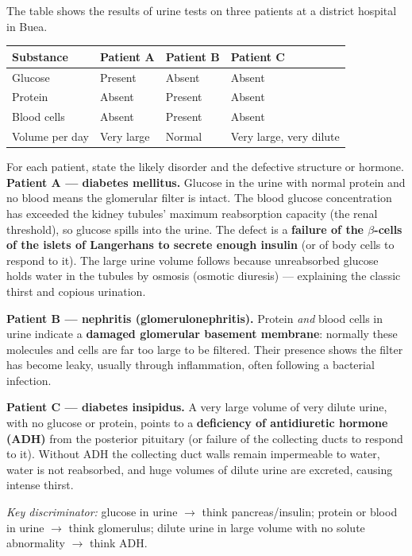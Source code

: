 \documentclass[11pt]{article}
\begin{document}
\begin{exoresolu}
The table shows the results of urine tests on three patients at a district hospital in Buea.

\begin{center}
\begin{tabularx}{\linewidth}{|l|X|X|X|}\hline
\rowcolor{popblueL} \textbf{Substance} & \textbf{Patient A} & \textbf{Patient B} & \textbf{Patient C} \\ \hline
Glucose & Present & Absent & Absent \\ \hline
Protein & Absent & Present & Absent \\ \hline
Blood cells & Absent & Present & Absent \\ \hline
Volume per day & Very large & Normal & Very large, very dilute \\ \hline
\end{tabularx}
\end{center}

For each patient, state the likely disorder and the defective structure or hormone.
\tcblower
\textbf{Patient A — diabetes mellitus.} Glucose in the urine with normal protein and no blood means the glomerular filter is intact. The blood glucose concentration has exceeded the kidney tubules' maximum reabsorption capacity (the renal threshold), so glucose spills into the urine. The defect is a \textbf{failure of the $\beta$-cells of the islets of Langerhans to secrete enough insulin} (or of body cells to respond to it). The large urine volume follows because unreabsorbed glucose holds water in the tubules by osmosis (osmotic diuresis) — explaining the classic thirst and copious urination.

\textbf{Patient B — nephritis (glomerulonephritis).} Protein \emph{and} blood cells in urine indicate a \textbf{damaged glomerular basement membrane}: normally these molecules and cells are far too large to be filtered. Their presence shows the filter has become leaky, usually through inflammation, often following a bacterial infection.

\textbf{Patient C — diabetes insipidus.} A very large volume of very dilute urine, with no glucose or protein, points to a \textbf{deficiency of antidiuretic hormone (ADH)} from the posterior pituitary (or failure of the collecting ducts to respond to it). Without ADH the collecting duct walls remain impermeable to water, water is not reabsorbed, and huge volumes of dilute urine are excreted, causing intense thirst.

\emph{Key discriminator:} glucose in urine $\rightarrow$ think pancreas/insulin; protein or blood in urine $\rightarrow$ think glomerulus; dilute urine in large volume with no solute abnormality $\rightarrow$ think ADH.
\end{exoresolu}
\end{document}
